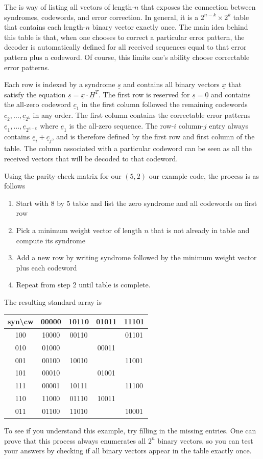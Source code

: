The  is way of listing all vectors of length-$n$ that exposes the connection between syndromes, codewords, and error correction.
In general, it is a $2^{n-k}\times 2^k$ table that contains each length-$n$ binary vector exactly once.
The main idea behind this table is that, when one chooses to correct a particular error pattern, the decoder is automatically defined for all received sequences equal to that error pattern plus a codeword.
Of course, this limits one's ability choose correctable error patterns.


Each row is indexed by a syndrome $\underline{s}$ and contains all binary vectors $\underline{x}$ that satisfy the equation $\underline{s}=\underline{x}\cdot\underline{H}^{T}$.
The first row is reserved for $\underline{s}=\underline{0}$ and contains the all-zero codeword $\underline{c}_1$ in the first column followed the remaining codewords $\underline{c}_2,\ldots,\underline{c}_{2^k}$ in any order.
The first column contains the correctable error patterns $\underline{e}_1 ,\ldots, \underline{e}_{2^{n-k}}$ where $\underline{e}_1$ is the all-zero sequence.
The row-$i$ column-$j$ entry always contains $\underline{e}_i + \underline{c}_j$, and is therefore defined by the first row and first column of the table.
The column associated with a particular codeword can be seen as all the received vectors that will be decoded to that codeword.


Using the parity-check matrix for our $(5,2)$ our example code, the process is as follows
\begin{enumerate}
\item Start with 8 by 5 table and list the zero syndrome and all codewords on first row
\item Pick a minimum weight vector of length $n$ that is not already in table and compute its syndrome
\item Add a new row by writing syndrome followed by the minimum weight vector plus each codeword
\item Repeat from step 2 until table is complete.
\end{enumerate}
The resulting standard array is
\begin{center}
\begin{tabular}{|c||c|c|c|c|}
\hline 
syn\textbackslash cw &  00000 & 10110 & 01011 & 11101\tabularnewline
\hline
\hline 
100 & 10000 & 00110 &  & 01101\tabularnewline
\hline 
010 & 01000 &  & 00011 & \tabularnewline
\hline 
001 & 00100 & 10010 &  & 11001\tabularnewline
\hline 
101 & 00010 &  & 01001 & \tabularnewline
\hline 
111 & 00001 & 10111 &  & 11100\tabularnewline
\hline 
110 & 11000 & 01110 & 10011 & \tabularnewline
\hline 
011 & 01100 & 11010 &  & 10001\tabularnewline
\hline
\end{tabular}
\end{center}
To see if you understand this example, try filling in the missing entries.
One can prove that this process always enumerates all $2^{n}$ binary vectors, so you can test your answers by checking if all binary vectors appear in the table exactly once.

